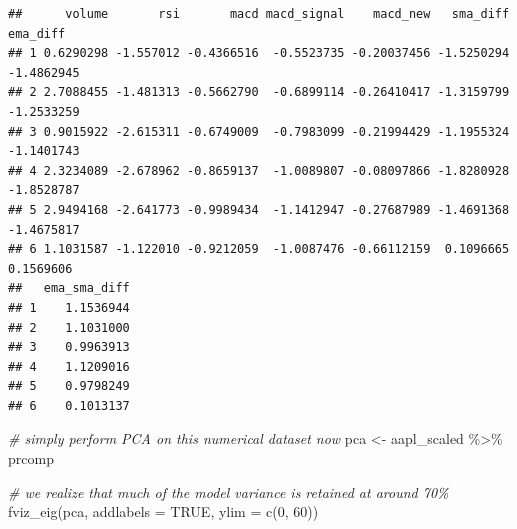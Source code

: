 \documentclass[
]{article}
\newenvironment{Shaded}{\begin{snugshade}}{\end{snugshade}}
\newcommand{\AlertTok}[1]{\textcolor[rgb]{0.94,0.16,0.16}{#1}}
\newcommand{\AttributeTok}[1]{\textcolor[rgb]{0.77,0.63,0.00}{#1}}
\newcommand{\CommentTok}[1]{\textcolor[rgb]{0.56,0.35,0.01}{\textit{#1}}}
\newcommand{\ConstantTok}[1]{\textcolor[rgb]{0.00,0.00,0.00}{#1}}
\newcommand{\DecValTok}[1]{\textcolor[rgb]{0.00,0.00,0.81}{#1}}
\newcommand{\FunctionTok}[1]{\textcolor[rgb]{0.00,0.00,0.00}{#1}}
\newcommand{\NormalTok}[1]{#1}
\newcommand{\OtherTok}[1]{\textcolor[rgb]{0.56,0.35,0.01}{#1}}
\newcommand{\SpecialCharTok}[1]{\textcolor[rgb]{0.00,0.00,0.00}{#1}}
\begin{document}
\begin{Shaded}
\end{Shaded}

\begin{verbatim}
##      volume       rsi       macd macd_signal    macd_new   sma_diff   ema_diff
## 1 0.6290298 -1.557012 -0.4366516  -0.5523735 -0.20037456 -1.5250294 -1.4862945
## 2 2.7088455 -1.481313 -0.5662790  -0.6899114 -0.26410417 -1.3159799 -1.2533259
## 3 0.9015922 -2.615311 -0.6749009  -0.7983099 -0.21994429 -1.1955324 -1.1401743
## 4 2.3234089 -2.678962 -0.8659137  -1.0089807 -0.08097866 -1.8280928 -1.8528787
## 5 2.9494168 -2.641773 -0.9989434  -1.1412947 -0.27687989 -1.4691368 -1.4675817
## 6 1.1031587 -1.122010 -0.9212059  -1.0087476 -0.66112159  0.1096665  0.1569606
##   ema_sma_diff
## 1    1.1536944
## 2    1.1031000
## 3    0.9963913
## 4    1.1209016
## 5    0.9798249
## 6    0.1013137
\end{verbatim}

\begin{Shaded}
\begin{Highlighting}[]
\CommentTok{\# simply perform PCA on this numerical dataset now}
\NormalTok{pca }\OtherTok{\textless{}{-}}\NormalTok{ aapl\_scaled }\SpecialCharTok{\%\textgreater{}\%}
\NormalTok{  prcomp}

\CommentTok{\# we realize that much of the model variance is retained at around 70\%}
\FunctionTok{fviz\_eig}\NormalTok{(pca, }\AttributeTok{addlabels =} \ConstantTok{TRUE}\NormalTok{, }\AttributeTok{ylim =} \FunctionTok{c}\NormalTok{(}\DecValTok{0}\NormalTok{, }\DecValTok{60}\NormalTok{))}
\end{Highlighting}
\end{Shaded}
\end{document}
